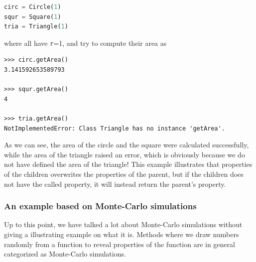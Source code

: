\lstset{basicstyle=\scriptsize}
\begin{lstlisting}[language=python]
circ = Circle(1)
squr = Square(1)
tria = Triangle(1)
\end{lstlisting}
where all have \texttt{r}=1, and try to compute their area as

\lstset{basicstyle=\scriptsize}
\begin{lstlisting}
>>> circ.getArea()
3.141592653589793

>>> squr.getArea()
4

>>> tria.getArea()
NotImplementedError: Class Triangle has no instance 'getArea'.
\end{lstlisting}

As we can see, the area of the circle and the square were calculated successfully, while the area of the triangle raised an error, which is obviously because we do not have defined the area of the triangle! This example illustrates that properties of the children overwrites the properties of the parent, but if the children does not have the called property, it will instead return the parent's property. 

\subsubsection{An example based on Monte-Carlo simulations}
Up to this point, we have talked a lot about Monte-Carlo simulations without giving a illustrating example on what it is. Methods where we draw numbers randomly from a function to reveal properties of the function are in general categorized as Monte-Carlo simulations. 

